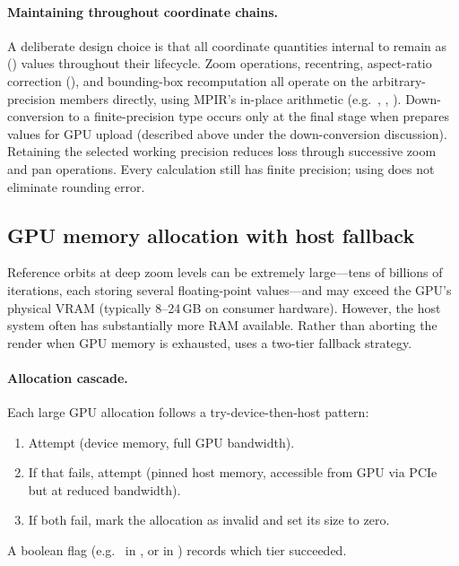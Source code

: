 \paragraph{Maintaining  throughout coordinate chains.}
\label{par:hp-invariant}
A deliberate design choice is that all coordinate quantities internal to
 remain as 
() values throughout their lifecycle.  Zoom operations,
recentring, aspect-ratio correction (), and
bounding-box recomputation all operate on the arbitrary-precision
members directly, using MPIR's in-place arithmetic (e.g.\
, , ).  Down-conversion
to a finite-precision type occurs only at the final stage when
 prepares values for GPU upload (described
above under the down-conversion discussion). Retaining the selected working
precision reduces loss through successive zoom and pan operations. Every calculation
still has finite precision; using \code{HighPrecision} does not eliminate rounding
error.

\subsection{GPU memory allocation with host fallback}
\label{subsec:gpu-mem-fallback}

Reference orbits at deep zoom levels can be extremely large---tens of
billions of iterations, each storing several floating-point
values---and may exceed the GPU's physical VRAM (typically 8--24\,GB
on consumer hardware).  However, the host system often has
substantially more RAM available.  Rather than aborting the render
when GPU memory is exhausted, \FractalShark{} uses a two-tier
fallback strategy.

\paragraph{Allocation cascade.}
Each large GPU allocation follows a try-device-then-host pattern:
\begin{enumerate}
\item Attempt  (device memory, full GPU bandwidth).
\item If that fails, attempt \code{cudaMallocHost}
      (pinned host memory, accessible from GPU via PCIe but at
      reduced bandwidth).
\item If both fail, mark the allocation as invalid and set
      its size to zero.
\end{enumerate}
A boolean flag (e.g.\  in
, or  in
) records which tier succeeded.

